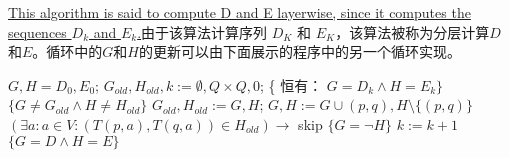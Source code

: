 \uline{This algorithm is said to compute D and E layerwise, since it computes the sequences $D_k$ and $E_k$.}由于该算法计算序列 $D_K$ 和 $E_K$，该算法被称为分层计算$D$和$E$。循环中的$G$和$H$的更新可以由下面展示的程序中的另一个循环实现。
\begin{algorithm}
    \caption{}\label{al:ttt}
    \begin{algorithmic}[1]
        \State $G,H=D_0,E_0$;
        \State $G_{old},H_{old},k:=\emptyset ,Q \times Q,0$;
        \State \{ 恒有： $G=D_k \land H =E_k \}$
            \State $\{G \not= G_{old} \land H \not= H_{old} \}$
            \State $G_{old},H_{old}:=G,H$;
                    \State $G,H:=G \cup {(p,q)},H \setminus \{(p,q)\}$
                \Else 
                    \State $(\exists a:a \in V : (T(p,a),T(q,a)) \in H_{old} ) \longrightarrow $ skip
                \EndIf
            \EndFor %
            \State $\{G=\neg H\}$
            \State $k:=k+1$
        \Until $ \{ G=D \land H=E \}$
    \end{algorithmic}
\end{algorithm}

